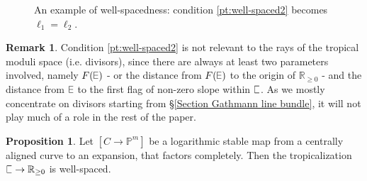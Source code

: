 \documentclass[11pt]{amsart}
\DeclareRobustCommand{\plE}{\text{\reflectbox{$\exists$}}}
\newcommand{\plC}{\scalebox{0.8}[1.3]{$\sqsubset$}}
\renewcommand{\to}{\rightarrow}
\newcommand{\RR}{\mathbb{R}}
\theoremstyle{definition}
\newtheorem{prop}[thm]{Proposition}
\theoremstyle{definition}
\newtheorem*{rem}{Remark}
\begin{document}
\begin{figure}
\caption{An example of well-spacedness: condition \eqref{pt:well-spaced2} becomes $\ell_1=\ell_2$.}
\label{fig:exa_well-spaced}
\end{figure}

\begin{rem}
Condition \eqref{pt:well-spaced2} is not relevant to the rays of the tropical moduli space (i.e. divisors), since there are always at least two parameters involved, namely $F(\plE)$ - or the distance from $F(\plE)$ to the origin of $\RR_{\geq 0}$ - and the distance from $\plE$ to the first flag of non-zero slope within $\plC$. As we mostly concentrate on divisors starting from \S \ref{Section Gathmann line bundle}, it will not play much of a role in the rest of the paper.
\end{rem}

\begin{prop}\label{prop: well-spaced}
Let $[C\to \mathbb P^m]$ be a logarithmic stable map from a centrally aligned curve to an expansion, that factors completely. Then the tropicalization $\plC\to \mathbb R_{\geq 0}$ is well-spaced.
\end{prop}
\end{document}
